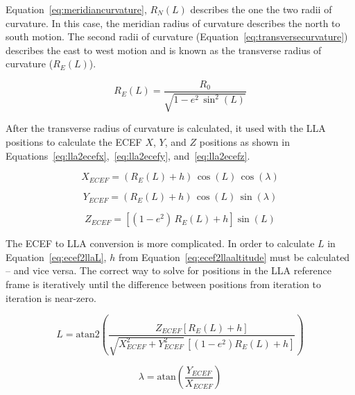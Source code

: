 \documentclass[12pt]{report}
\begin{document}
Equation~\ref{eq:meridiancurvature}, \(R_N (L)\) describes the one the two radii of curvature. In this case, the meridian radius of curvature describes the north to south motion. The second radii of curvature (Equation~\ref{eq:transversecurvature}) describes the east to west motion and is known as the transverse radius of curvature (\(R_E (L) \)).

\begin{equation}\label{eq:transversecurvature}
  R_E (L) = \frac{R_0}{\sqrt{1 - e^2 \, \sin^2 {\left(L\right)}}}
\end{equation}

After the transverse radius of curvature is calculated, it used with the LLA positions to calculate the ECEF \(X\), \(Y\), and \(Z\) positions as shown in Equations~\ref{eq:lla2ecefx},~\ref{eq:lla2ecefy}, and~\ref{eq:lla2ecefz}.

\begin{equation}\label{eq:lla2ecefx}
  X_{ECEF} = \left(R_E (L) + h\right) \, \cos \left(L\right) \, \cos \left(\lambda\right)
\end{equation}

\begin{equation}\label{eq:lla2ecefy}
  Y_{ECEF} = \left(R_E (L) + h\right) \, \cos \left(L\right) \, \sin \left(\lambda\right)
\end{equation}

\begin{equation}\label{eq:lla2ecefz}
  Z_{ECEF} = \left[\left(1 - e^2\right) \, R_E (L) + h\right] \sin \left(L\right)
\end{equation}

The ECEF to LLA conversion is more complicated. In order to calculate \(L\) in Equation~\ref{eq:ecef2llaL}, \(h\) from Equation~\ref{eq:ecef2llaaltitude} must be calculated {--} and vice versa. The correct way to solve for positions in the LLA reference frame is iteratively until the difference between positions from iteration to iteration is near-zero.

\begin{equation}\label{eq:ecef2llaL}
  L = \textrm{atan2}\left(\frac{Z_{ECEF} \left[R_E (L) + h\right]}{\sqrt{X_{ECEF}^2 + Y^2_{ECEF}} \, \left[ \left(1 - e^2\right) R_E (L) + h\right]}\right)
\end{equation}

\begin{equation}\label{eq:ecef2llalambda}
  \lambda = \textrm{atan}\left(\frac{Y_{ECEF}}{X_{ECEF}}\right)
\end{equation}
\end{document}
